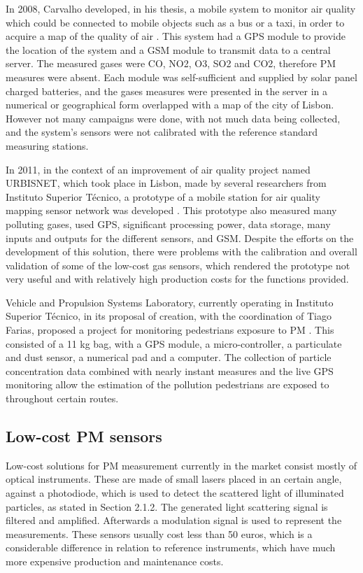 In 2008, Carvalho developed, in his thesis, a mobile system to monitor air quality which could be connected to mobile objects such as a bus or a taxi, in order to acquire a map of the quality of air \cite{Carvalho2008}. This system had a \ac{GPS} module to provide the location of the system and a \ac{GSM} module to transmit data to a central server. The measured gases were CO, NO2, O3, SO2 and CO2, therefore PM measures were absent. Each module was self-sufficient and supplied by solar panel charged batteries, and the gases measures were presented in the server in a numerical or geographical form overlapped with a map of the city of Lisbon. However not many campaigns were done, with not much data being collected, and the system's sensors were not calibrated with the reference standard measuring stations. 

In 2011, in the context of an improvement of air quality project named URBISNET, which took place in Lisbon, made by several researchers from Instituto Superior Técnico, a prototype of a mobile station for air quality mapping sensor network was developed \cite{Quelhas2011}. This prototype also measured many polluting gases, used GPS, significant processing power, data storage, many inputs and outputs for the different sensors, and GSM. Despite the efforts on the development of this solution, there were problems with the calibration and overall validation of some of the low-cost gas sensors, which rendered the prototype not very useful and with relatively high production costs for the functions provided.

Vehicle and Propulsion Systems Laboratory, currently operating in Instituto Superior Técnico, in its proposal of creation, with the coordination of Tiago Farias, proposed a project for monitoring pedestrians exposure to PM \cite{Farias2013}. This consisted of a 11 kg bag, with a GPS module, a micro-controller, a particulate and dust sensor, a numerical pad and a computer. The collection of particle concentration data combined with nearly instant measures and the live GPS monitoring allow the estimation of the pollution pedestrians are exposed to throughout certain routes.

\subsection{Low-cost PM sensors}

Low-cost solutions for PM measurement currently in the market consist mostly of optical instruments. These are made of small lasers placed in an certain angle, against a photodiode, which is used to detect the scattered light of illuminated particles, as stated in Section 2.1.2. The generated light scattering signal is filtered and amplified. Afterwards a modulation signal is used to represent the measurements. These sensors usually cost less than 50 euros, which is a considerable difference in relation to reference instruments, which have much more expensive production and maintenance costs.

